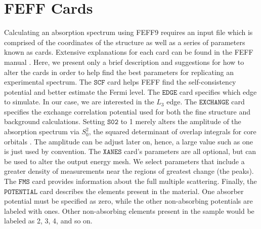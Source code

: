 \section{FEFF Cards} \label{app:feff-cards}
Calculating an absorption spectrum using FEFF9 requires an input file which is comprised of the coordinates of the structure as well as a series of parameters known as cards. Extensive explanations for each card can be found in the FEFF manual \cite{rehr2010parameter}. Here, we present only a brief description and suggestions for how to alter the cards in order to help find the best parameters for replicating an experimental spectrum.  The $ \texttt{SCF} $  card helps FEFF find the self-consistency potential and better estimate the Fermi level. The $ \texttt{EDGE} $ card specifies which edge to simulate. In our case, we are interested in the $L_3$ edge. The $ \texttt{EXCHANGE} $ card specifies the exchange correlation potential used for both the fine structure and background calculations. Setting $ \texttt{S02} $ to 1 merely alters the amplitude of the absorption spectrum via $ S_0^2 $, the squared determinant of overlap integrals for core orbitals \cite{rehr2010parameter}. The amplitude can be adjust later on, hence, a large value such as one is just used by convention. The $ \texttt{XANES} $ card's parameters are all optional, but can be used to alter the output energy mesh. We select parameters that include a greater density of measurements near the regions of greatest change (the peaks). The $ \texttt{FMS} $ card provides information about the full multiple scattering. Finally, the $ \texttt{POTENTIAL} $ card describes the elements present in the material. One absorber potential must be specified as zero, while the other non-absorbing potentials are labeled with ones. Other non-absorbing elements present in the sample would be labeled as 2, 3, 4, and so on.


	


